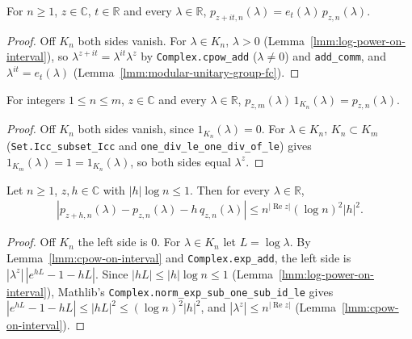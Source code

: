\begin{lemma}[The Shift $p_{z+it,n} = e_t\,p_{z,n}$]
    \label{lmm:modular-power-function-shift}
    \leanok
    For $n \ge 1$, $z \in \mathbb{C}$, $t \in \mathbb{R}$ and every $\lambda \in \mathbb{R}$, $p_{z+it,n}(\lambda) = e_t(\lambda)\,p_{z,n}(\lambda)$.
\end{lemma}
\begin{proof}
    \leanok
    Off $K_n$ both sides vanish. For $\lambda \in K_n$, $\lambda > 0$ (Lemma~\ref{lmm:log-power-on-interval}), so $\lambda^{z+it} = \lambda^{it}\lambda^z$ by \texttt{Complex.cpow\_add} ($\lambda \ne 0$) and \texttt{add\_comm}, and $\lambda^{it} = e_t(\lambda)$ (Lemma~\ref{lmm:modular-unitary-group-fc}).
\end{proof}

\begin{lemma}[Restriction of $p_{z,m}$ to $K_n$]
    \label{lmm:modular-power-function-restrict}
    \leanok
    For integers $1 \le n \le m$, $z \in \mathbb{C}$ and every $\lambda \in \mathbb{R}$, $p_{z,m}(\lambda)\,1_{K_n}(\lambda) = p_{z,n}(\lambda)$.
\end{lemma}
\begin{proof}
    \leanok
    Off $K_n$ both sides vanish, since $1_{K_n}(\lambda) = 0$. For $\lambda \in K_n$, $K_n \subset K_m$ (\texttt{Set.Icc\_subset\_Icc} and \texttt{one\_div\_le\_one\_div\_of\_le}) gives $1_{K_m}(\lambda) = 1 = 1_{K_n}(\lambda)$, so both sides equal $\lambda^z$.
\end{proof}

\begin{lemma}
    \label{lmm:modular-power-taylor}
    \leanok
    Let $n \ge 1$, $z, h \in \mathbb{C}$ with $|h| \log n \le 1$. Then for every $\lambda \in \mathbb{R}$,
    \begin{align}
        \left| p_{z+h,n}(\lambda) - p_{z,n}(\lambda) - h\,q_{z,n}(\lambda) \right| \le n^{|\operatorname{Re} z|} (\log n)^2 |h|^2.
    \end{align}
\end{lemma}
\begin{proof}
    \leanok
    Off $K_n$ the left side is $0$. For $\lambda \in K_n$ let $L = \log\lambda$. By Lemma~\ref{lmm:cpow-on-interval} and \texttt{Complex.exp\_add}, the left side is $|\lambda^z|\,|e^{hL} - 1 - hL|$. Since $|hL| \le |h|\log n \le 1$ (Lemma~\ref{lmm:log-power-on-interval}), Mathlib's \texttt{Complex.norm\_exp\_sub\_one\_sub\_id\_le} gives $|e^{hL} - 1 - hL| \le |hL|^2 \le (\log n)^2|h|^2$, and $|\lambda^z| \le n^{|\operatorname{Re} z|}$ (Lemma~\ref{lmm:cpow-on-interval}).
\end{proof}

